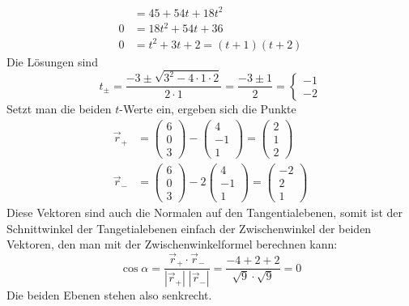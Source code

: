\begin{loesung}
\begin{align*}
&=45+54t+18t^2
\\
0&=18t^2+54t+36
\\
0&=t^2+3t+2=(t+1)(t+2)
\end{align*}
Die Lösungen sind
\[
t_{\pm}=\frac{-3\pm\sqrt{3^2-4\cdot1\cdot 2}}{2\cdot 1}
=\frac{-3\pm1}{2}
=\begin{cases}
-1\\
-2
\end{cases}
\]
Setzt man die beiden $t$-Werte ein, ergeben sich die Punkte
\begin{align*}
\vec r_+&=
\begin{pmatrix}6\\0\\3\end{pmatrix}
-
\begin{pmatrix}4\\-1\\1\end{pmatrix}
=
\begin{pmatrix}2\\1\\2\end{pmatrix}
\\
\vec r_-&=
\begin{pmatrix}6\\0\\3\end{pmatrix}
-2
\begin{pmatrix}4\\-1\\1\end{pmatrix}
=
\begin{pmatrix}-2\\2\\1\end{pmatrix}
\end{align*}
Diese Vektoren sind auch die Normalen auf den Tangentialebenen,
somit ist der Schnittwinkel der Tangetialebenen einfach der
Zwischenwinkel der beiden Vektoren, den man mit der Zwischenwinkelformel
berechnen kann:
\[
\cos \alpha=
\frac{\vec r_+\cdot\vec r_-} {|\vec r_+|\;|\vec r_-|}
=\frac{-4+2+2}{\sqrt{9}\cdot \sqrt{9}}=0
\]
Die beiden Ebenen stehen also senkrecht.
\end{loesung}


